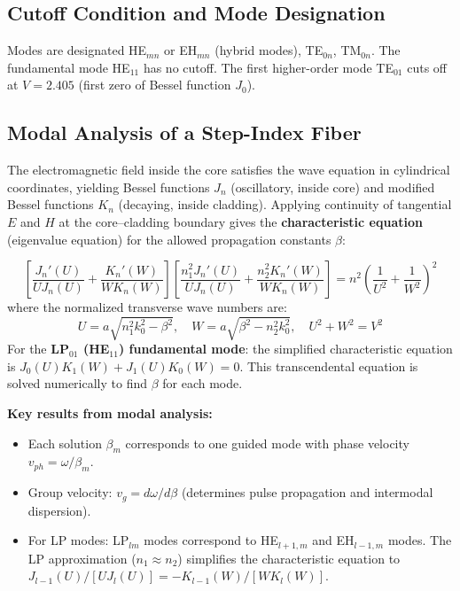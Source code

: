\documentclass[12pt,a4paper]{article}
\begin{document}
\subsection{Cutoff Condition and Mode Designation}
Modes are designated HE$_{mn}$ or EH$_{mn}$ (hybrid modes), TE$_{0n}$, TM$_{0n}$. The fundamental mode HE$_{11}$ has no cutoff. The first higher-order mode TE$_{01}$ cuts off at $V = 2.405$ (first zero of Bessel function $J_0$).

\subsection{Modal Analysis of a Step-Index Fiber}
The electromagnetic field inside the core satisfies the wave equation in cylindrical coordinates, yielding Bessel functions $J_n$ (oscillatory, inside core) and modified Bessel functions $K_n$ (decaying, inside cladding). Applying continuity of tangential $E$ and $H$ at the core--cladding boundary gives the \textbf{characteristic equation} (eigenvalue equation) for the allowed propagation constants $\beta$:

\begin{tcolorbox}[formulabox, title={\textbf{Characteristic Equation for Step-Index Fiber}}]
\[
\left[ \frac{J_n'(U)}{U J_n(U)} + \frac{K_n'(W)}{W K_n(W)} \right]
\left[ \frac{n_1^2 J_n'(U)}{U J_n(U)} + \frac{n_2^2 K_n'(W)}{W K_n(W)} \right]
= n^2 \left(\frac{1}{U^2} + \frac{1}{W^2}\right)^{\!2}
\]
where the normalized transverse wave numbers are:
\[
U = a\sqrt{n_1^2 k_0^2 - \beta^2}, \quad W = a\sqrt{\beta^2 - n_2^2 k_0^2}, \quad U^2 + W^2 = V^2
\]
For the \textbf{LP$_{01}$ (HE$_{11}$) fundamental mode}: the simplified characteristic equation is $J_0(U) K_1(W) + J_1(U) K_0(W) = 0$. This transcendental equation is solved numerically to find $\beta$ for each mode.
\end{tcolorbox}

\textbf{Key results from modal analysis:}
\begin{itemize}[leftmargin=*, itemsep=2pt]
  \item Each solution $\beta_m$ corresponds to one guided mode with phase velocity $v_{ph} = \omega/\beta_m$.
  \item Group velocity: $v_g = d\omega/d\beta$ (determines pulse propagation and intermodal dispersion).
  \item For LP modes: LP$_{lm}$ modes correspond to HE$_{l+1,m}$ and EH$_{l-1,m}$ modes. The LP approximation ($n_1 \approx n_2$) simplifies the characteristic equation to $J_{l-1}(U) / [U J_l(U)] = -K_{l-1}(W)/[W K_l(W)]$.
\end{itemize}
\end{document}
